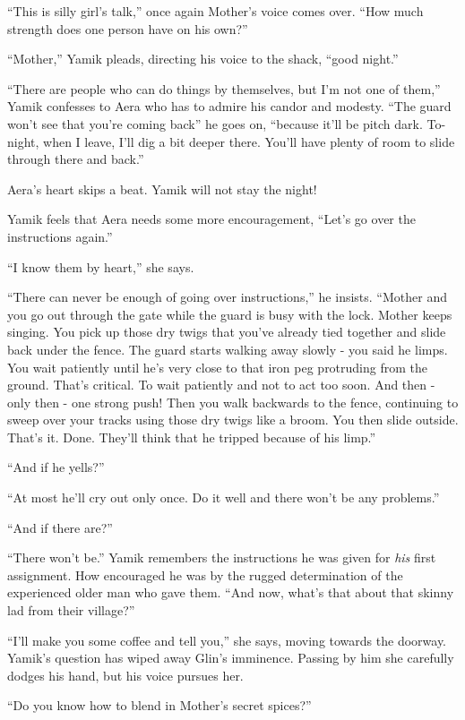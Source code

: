 \documentclass[twoside,11pt]{book}
\begin{document}
``This is silly girl's talk,'' once again Mother's voice comes over. ``How much strength
does one person have on his own?''

``Mother,'' Yamik pleads, directing his voice to the shack, ``good night.''

``There are people who can do things by themselves, but I'm not one of them,''
Yamik confesses to Aera who has to admire his candor and modesty. ``The guard
won't see that you're coming back'' he goes on, ``because it'll be pitch dark. To-night, when I leave, I'll dig a bit
deeper there. You'll have plenty of room to slide through there and back.''

Aera's heart skips a beat. Yamik will not stay the night!

Yamik feels that Aera needs some more encouragement, ``Let's go over the instructions again.''

``I know them by heart,'' she says.

``There can never be enough of going over instructions,'' he insists. ``Mother and you go
out through the gate while the guard is busy with the lock. Mother keeps singing. You pick up those dry twigs that
you've already tied together and slide back under the fence. The guard starts walking away slowly
- you said he limps. You wait patiently until he's very close to that iron
peg protruding from the ground. That's critical. To wait patiently and not to act too soon. And then - only then -
one strong push! Then you walk backwards to the fence, continuing to sweep over your tracks using those dry
twigs like a broom. You then slide outside. That's it. Done. They'll think
that he tripped because of his limp.''

``And if he yells?''

``At most he'll cry out only once. Do it well and there won't be any problems.''

``And if there are?''

``There won't be.'' Yamik remembers the instructions he was given for \textit{his} first assignment. How
encouraged he was by the rugged determination of the experienced older man who gave them. ``And now, what's that about
that skinny lad from their village?''

``I'll make you some coffee and tell you,'' she says, moving towards the doorway. Yamik's question has wiped away
Glin's imminence. Passing by him she carefully dodges his hand, but his voice pursues her.

``Do you know how to blend in Mother's secret spices?''
\end{document}
